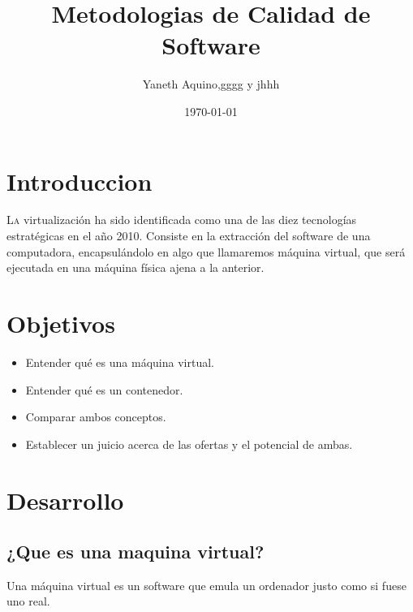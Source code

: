 \documentclass[twoside,twocolumn]{article}
\title{Metodologias de Calidad de Software} %
\author{Yaneth Aquino,gggg y jhhh}
\date{\today} %
\begin{document}
\maketitle


\section{Introduccion}

\lettrine[nindent=0em,lines=3]{L}a virtualización ha sido identificada como una de las diez tecnologías estratégicas en el año 2010. Consiste en la extracción del software de una computadora, encapsulándolo en algo que llamaremos máquina virtual, que será ejecutada en una máquina física ajena a la anterior.





\section{Objetivos}

\begin{itemize}
\item Entender qué es una máquina virtual.
\item Entender qué es un contenedor.
\item Comparar ambos conceptos.
\item Establecer un juicio acerca de las ofertas y el potencial de ambas.

\end{itemize}





\section{Desarrollo}

\subsection{¿Que es una maquina virtual?}

Una máquina virtual es un software que emula un ordenador justo como si fuese uno real. 
\end{document}
